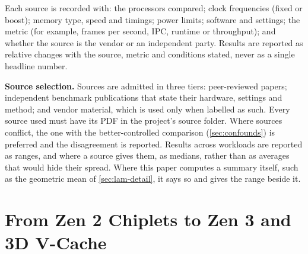 Each source is recorded with: the processors compared; clock frequencies (fixed or boost); memory type, speed and timings; power limits; software and settings; the metric (for example, frames per second, IPC, runtime or throughput); and whether the source is the vendor or an independent party. Results are reported as relative changes with the source, metric and conditions stated, never as a single headline number.

\textbf{Source selection.} Sources are admitted in three tiers: peer-reviewed papers; independent benchmark publications that state their hardware, settings and method; and vendor material, which is used only when labelled as such. Every source used must have its PDF in the project's source folder. Where sources conflict, the one with the better-controlled comparison (\cref{sec:confounds}) is preferred and the disagreement is reported. Results across workloads are reported as ranges, and where a source gives them, as medians, rather than as averages that would hide their spread. Where this paper computes a summary itself, such as the geometric mean of \cref{sec:lam-detail}, it says so and gives the range beside it.

\section{From Zen 2 Chiplets to Zen 3 and 3D V-Cache}
\label{sec:zen-progression}

